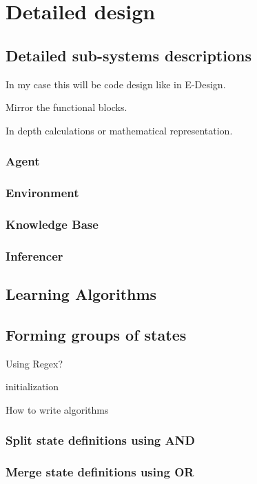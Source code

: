 \chapter{Detailed design} 

\section{Detailed sub-systems descriptions}

In my case this will be code design like in E-Design.

Mirror the functional blocks.

In depth calculations or mathematical representation.

\subsection{Agent}
		
	
\subsection{Environment}



\subsection{Knowledge Base}



\subsection{Inferencer}



\section{Learning Algorithms} 

\section{Forming groups of states}
Using Regex?

\begin{algorithm}[H]
\SetAlgoLined
{}
 initialization\;
 \caption{How to write algorithms}
\end{algorithm}


\subsection{Split state definitions using AND}
	
\subsection{Merge state definitions using OR}
